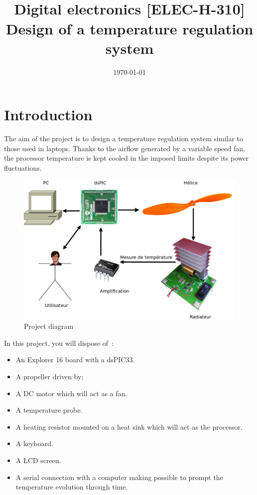 \documentclass[11pt,a4paper]{article}
\date{\vspace{-1.7cm}\mydate\today}
\title{\vspace{-2cm} \labonumber\\ Digital electronics [ELEC-H-310]\\Design of a temperature regulation system\ifthenelse{\boolean{corrige}}{~\\Corrigé}{}}
\theoremstyle{definition}%
\begin{document}
\pagestyle{empty}
\maketitle



\section{Introduction}
The aim of the project is to design a temperature regulation system similar to those used in laptops.
Thanks to the airflow generated by a variable speed fan, the processor temperature is kept cooled in the imposed limits despite its power fluctuations.

\begin{center}
\begin{figure}[H]
\includegraphics[width=\textwidth]{workflow}
\caption{Project diagram}
\label{fig:workflow}
\end{figure}
\end{center}

In this project, you will dispose of~:
\begin{itemize}
	\item An Explorer 16 board with a dsPIC33.
	\item A propeller driven by;
	\item A DC motor which will act as a fan.
	\item A temperature probe.
	\item A heating resistor mounted on a heat sink which will act as the processor.
	\item A keyboard.
	\item A LCD screen.
	\item A serial connection with a computer making possible to prompt the temperature evolution through time.
\end{itemize}
\end{document}
